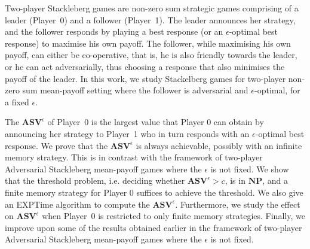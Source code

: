 Two-player Stackleberg games are non-zero sum strategic games comprising of a leader (Player~0) and a follower (Player~1). The leader announces her strategy, and the follower responds by playing a best response (or an $\epsilon$-optimal best response) to maximise his own payoff. The follower, while maximising his own payoff, can either be co-operative, that is, he is also friendly towards the leader, or he can act adversarially, thus choosing a response that also minimises the payoff of the leader. In this work, we study Stackelberg games for two-player non-zero sum mean-payoff setting where the follower is adversarial and $\epsilon$-optimal, for a fixed $\epsilon$.

The $\mathbf{ASV}^{\epsilon}$ of Player~0 is the largest value that Player 0 can obtain by announcing her strategy to Player~1 who in turn responds with an $\epsilon$-optimal best response.
We prove that the $\mathbf{ASV}^{\epsilon}$ is always achievable, possibly with an infinite memory strategy.
This is in contrast with the framework of two-player Adversarial Stackleberg mean-payoff games where the $\epsilon$ is not fixed.
We show that the threshold problem, i.e. deciding whether $\mathbf{ASV}^{\epsilon} > c$, is in $\textbf{NP}$, and a finite memory strategy for Player 0 suffices to achieve the threshold.
We also give an {\sf EXPTime} algorithm to compute the $\mathbf{ASV}^{\epsilon}$.
Furthermore, we study the effect on $\mathbf{ASV}^{\epsilon}$ when Player~0 is restricted to only finite memory strategies.
Finally, we improve upon some of the results obtained earlier in the framework of two-player Adversarial Stackleberg mean-payoff games where the $\epsilon$ is not fixed.